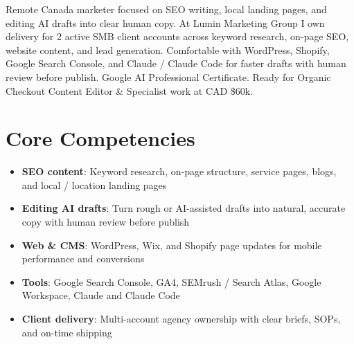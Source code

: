 \documentclass[11pt,a4paper,sans]{moderncv}
\begin{document}
\makecvtitle

\vspace{6pt}
\small{Remote Canada marketer focused on SEO writing, local landing pages, and editing AI drafts into clear human copy. At Lumin Marketing Group I own delivery for 2 active SMB client accounts across keyword research, on-page SEO, website content, and lead generation. Comfortable with WordPress, Shopify, Google Search Console, and Claude / Claude Code for faster drafts with human review before publish. Google AI Professional Certificate. Ready for Organic Checkout Content Editor \& Specialist work at CAD \$60k.}

\section{Core Competencies}
\vspace{1pt}
\begin{itemize}
\item \textbf{SEO content}: Keyword research, on-page structure, service pages, blogs, and local / location landing pages
\item \textbf{Editing AI drafts}: Turn rough or AI-assisted drafts into natural, accurate copy with human review before publish
\item \textbf{Web \& CMS}: WordPress, Wix, and Shopify page updates for mobile performance and conversions
\item \textbf{Tools}: Google Search Console, GA4, SEMrush / Search Atlas, Google Workspace, Claude and Claude Code
\item \textbf{Client delivery}: Multi-account agency ownership with clear briefs, SOPs, and on-time shipping
\end{itemize}
\end{document}
